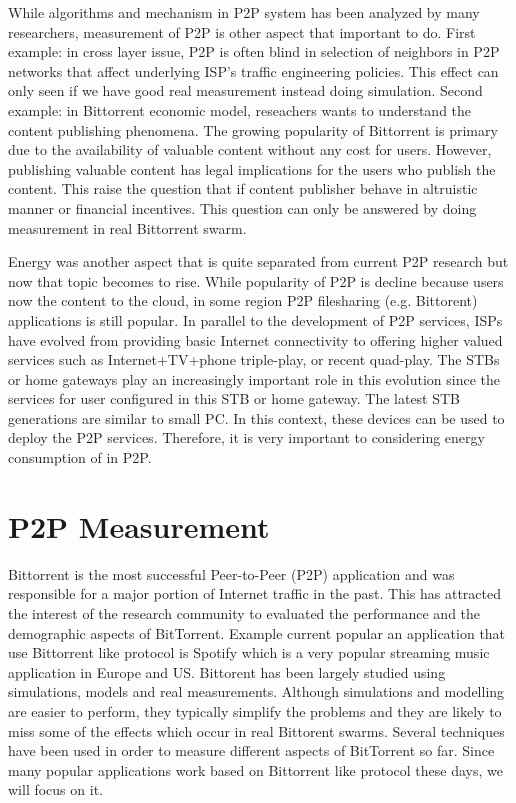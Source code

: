While algorithms and mechanism in P2P system has been analyzed by many researchers, measurement of P2P is other aspect that important to do. 
First example: in cross layer issue, P2P is often blind in selection of neighbors in P2P networks that affect underlying ISP's traffic engineering policies.  
This effect can only seen if we have good real measurement instead doing simulation.
Second example: in Bittorrent economic model, reseachers wants to understand the content publishing phenomena. 
The growing popularity of Bittorrent is primary due to the availability of valuable content without any cost for users.
However, publishing valuable content has legal implications for the users who publish the content.
This raise the question that if content publisher behave in altruistic manner or financial incentives. 
This question can only be answered by doing measurement in real Bittorrent swarm. 

Energy was another aspect that is quite separated from current P2P research but now that topic becomes to rise. 
While popularity of P2P is decline because users now the content to the cloud, in some region P2P filesharing (e.g. Bittorent) applications is still popular.
In parallel to the development of P2P services, ISPs have evolved from providing basic Internet connectivity to offering higher valued services such as Internet+TV+phone triple-play, or recent quad-play. 
The STBs or home gateways play an increasingly important role in this evolution since the services for user configured in this STB or home gateway.
The latest STB generations are similar to small PC. 
In this context, these devices can be used to deploy the  P2P services. 
Therefore, it is very important to considering energy consumption of in P2P.


\section{P2P Measurement}

Bittorrent is the most successful Peer-to-Peer (P2P) application and was responsible for a major portion of Internet traffic in the past.
This has attracted the interest of the research community to evaluated the performance and the demographic aspects of BitTorrent.
Example current popular an application that use Bittorrent like protocol is Spotify which is a very popular streaming music application in Europe and US.
Bittorent has been largely studied using simulations, models and real measurements. 
Although simulations and modelling are easier to perform, they typically simplify the problems and they are likely to miss some of the effects which occur in real Bittorent swarms. 
Several techniques have been used in order to measure different aspects of BitTorrent so far. 
Since many popular applications work based on Bittorrent like protocol these days, we will focus on it.

